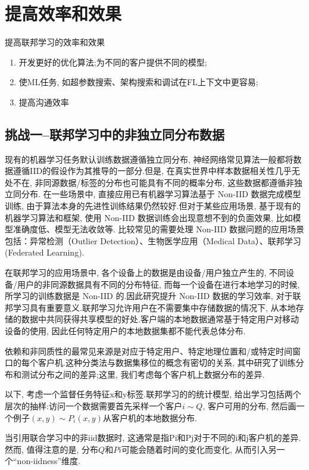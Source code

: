 \documentclass[a4paper]{article}
\begin{document}
\section{提高效率和效果}

提高联邦学习的效率和效果
\begin{enumerate}
    \item 开发更好的优化算法;为不同的客户提供不同的模型;
    \item 使ML任务, 如超参数搜索、架构搜索和调试在FL上下文中更容易;
    \item 提高沟通效率
\end{enumerate} 

\subsection{挑战一--联邦学习中的非独立同分布数据}
现有的机器学习任务默认训练数据遵循独立同分布, 神经网络常见算法一般都将数据遵循IID的假设作为其推导的一部分.但是, 在真实世界中样本数据相关性几乎无处不在, 非同源数据/标签的分布也可能具有不同的概率分布, 这些数据都遵循非独立同分布.
在一些场景中, 直接应用已有机器学习算法基于 Non-IID 数据完成模型训练, 由于算法本身的先进性训练结果仍然较好.但对于某些应用场景, 基于现有的机器学习算法和框架, 使用 Non-IID 数据训练会出现意想不到的负面效果, 比如模型准确度低、模型无法收敛等.
比较常见的需要处理 Non-IID 数据问题的应用场景包括：异常检测（Outlier Detection）、生物医学应用（Medical Data）、联邦学习 (Federated Learning).

在联邦学习的应用场景中, 各个设备上的数据是由设备/用户独立产生的, 不同设备/用户的非同源数据具有不同的分布特征, 而每一个设备在进行本地学习的时候, 所学习的训练数据是 Non-IID 的.因此研究提升 Non-IID 数据的学习效率, 对于联邦学习具有重要意义.联邦学习允许用户在不需要集中存储数据的情况下, 从本地存储的数据中共同获得共享模型的好处.客户端的本地数据通常基于特定用户对移动设备的使用, 因此任何特定用户的本地数据集都不能代表总体分布.


依赖和非同质性的最常见来源是对应于特定用户、特定地理位置和/或特定时间窗口的每个客户机.这种分类法与数据集移位的概念有密切的关系,  其中研究了训练分布和测试分布之间的差异;这里, 我们考虑每个客户机上数据分布的差异.

以下, 考虑一个监督任务特征x和y标签.联邦学习的的统计模型, 给出学习包括两个层次的抽样:访问一个数据需要首先采样一个客户$i\sim Q$, 客户可用的分布, 然后画一个例子$(x,  y) \sim P_i(x,  y)$从客户机的本地数据分布.

当引用联合学习中的非iid数据时, 这通常是指Pi和Pj对于不同的i和j客户机的差异.然而, 值得注意的是, 分布$Q$和$Pi$可能会随着时间的变化而变化, 从而引入另一个“non-iidness”维度.
\end{document}
